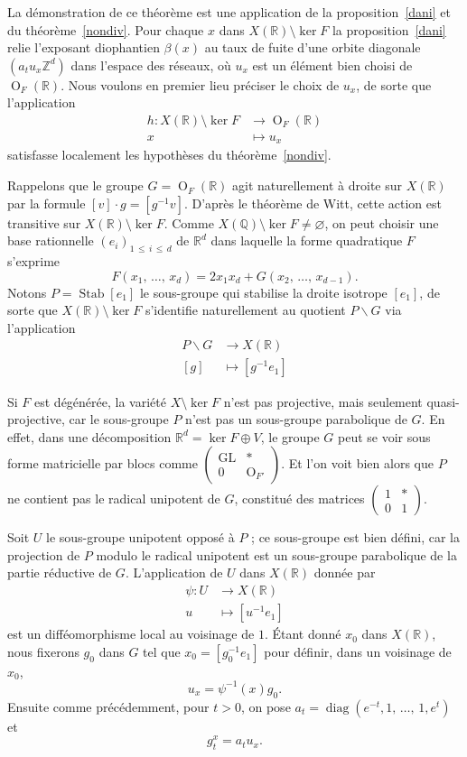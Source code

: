 \documentclass[AHL,Unicode,longabstracts,francais,published]{cedram}
\DeclareMathOperator{\GL}{GL}
\DeclareMathOperator{\GO}{O}
\DeclareMathOperator{\diag}{diag}
\DeclareMathOperator{\Stab}{Stab}
\newcommand{\bcs}{\backslash}
\newcommand{\R}{\mathbb{R}}
\newcommand{\Z}{\mathbb{Z}}
\newcommand{\Q}{\mathbb{Q}}
\begin{document}
La démonstration de ce théorème est une application de la proposition~\ref{dani} et du théorème~\ref{nondiv}. Pour chaque $x$ dans $X(\R)\setminus\ker F$ la proposition~\ref{dani} relie l'exposant diophantien $\beta(x)$ au taux de fuite d'une orbite diagonale $(a_tu_x\Z^d)$ dans l'espace des réseaux, où $u_x$ est un élément bien choisi de $\GO_F(\R)$. Nous voulons en premier lieu préciser le choix de $u_x$, de sorte que l'application
\begin{align*}
h:  X(\R)\setminus\ker F & \to  \GO_F(\R)\\
 x & \mapsto  u_x
\end{align*}
satisfasse localement les hypothèses du théorème~\ref{nondiv}.

Rappelons que le groupe $G=\GO_F(\R)$ agit naturellement à droite sur $X(\R)$ par la formule $[v]\cdot g = [g^{-1}v]$. D'après le théorème de Witt, cette action est transitive sur $X(\R)\setminus\ker F$. Comme $X(\Q)\setminus\ker F\neq\varnothing$, on peut choisir une base rationnelle $(e_i)_{1\,\leq\,i\,\leq\,d}$ de $\R^d$ dans laquelle la forme quadratique $F$ s'exprime
\[
F(x_1,\,\dots,\,x_d) = 2x_1x_d + G(x_2,\,\dots,\,x_{d-1}).
\]
Notons $P=\Stab[e_1]$ le sous-groupe qui stabilise la droite isotrope $[e_1]$, de sorte que $X(\R)\setminus\ker F$ s'identifie naturellement au quotient $P\bcs G$ via l'application
\begin{align*}
P\bcs G & \to  X(\R)\\
{[g]} & \mapsto  {\left[g^{-1}e_1\right]}
\end{align*}


\begin{rema}
Si $F$ est dégénérée, la variété $X\setminus\ker F$ n'est pas projective, mais seulement quasi-projective, car le sous-groupe $P$ n'est pas un sous-groupe parabolique de $G$. En effet, dans une décomposition $\R^d=\ker F\oplus V$, le groupe $G$ peut se voir sous forme matricielle par blocs comme $(
\begin{smallmatrix}\GL & *\\ 0 & \GO_{F'}
\end{smallmatrix})$.
Et l'on voit bien alors que $P$ ne contient pas le radical unipotent de $G$, constitué des matrices $(
\begin{smallmatrix} 1 & *\\ 0 & 1
\end{smallmatrix})$.
\end{rema}

Soit $U$ le sous-groupe unipotent opposé à $P$ ; ce sous-groupe est bien défini, car la projection de $P$ modulo le radical unipotent est un sous-groupe parabolique de la partie réductive de $G$. L'application de $U$ dans $X(\R)$ donnée par
\begin{align*}
\psi:  U & \to  X(\R)\\
 u & \mapsto  \left[u^{-1}e_1\right]
\end{align*}
est un difféomorphisme local au voisinage de $1$. Étant donné $x_0$ dans $X(\R)$, nous fixerons $g_0$ dans $G$ tel que $x_0=[g_0^{-1}e_1]$ pour définir, dans un voisinage de $x_0$,
\[
u_x = \psi^{-1}(x)g_0.
\]
Ensuite comme précédemment, pour $t>0$, on pose $a_t=\diag(e^{-t},1,\,\dots,\,1,e^t)$ et
\[
g_t^x = a_tu_x.
\]
\end{document}
